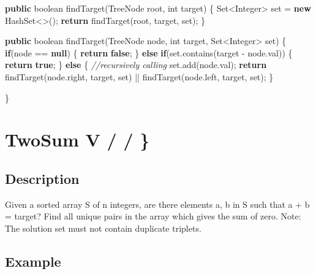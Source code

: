 \documentclass[]{book}
\newenvironment{Shaded}{\begin{snugshade}}{\end{snugshade}}
\newcommand{\BuiltInTok}[1]{#1}
\newcommand{\CommentTok}[1]{\textcolor[rgb]{0.56,0.35,0.01}{\textit{#1}}}
\newcommand{\DataTypeTok}[1]{\textcolor[rgb]{0.13,0.29,0.53}{#1}}
\newcommand{\FunctionTok}[1]{\textcolor[rgb]{0.00,0.00,0.00}{#1}}
\newcommand{\KeywordTok}[1]{\textcolor[rgb]{0.13,0.29,0.53}{\textbf{#1}}}
\newcommand{\NormalTok}[1]{#1}
\begin{document}
\begin{Shaded}
\begin{Highlighting}[]
\KeywordTok{public} \DataTypeTok{boolean} \FunctionTok{findTarget}\NormalTok{(}\BuiltInTok{TreeNode}\NormalTok{ root, }\DataTypeTok{int}\NormalTok{ target) \{}
    \BuiltInTok{Set}\NormalTok{<}\BuiltInTok{Integer}\NormalTok{> set = }\KeywordTok{new} \BuiltInTok{HashSet}\NormalTok{<>();}
    \KeywordTok{return} \FunctionTok{findTarget}\NormalTok{(root, target, set);}
\NormalTok{\}}

\KeywordTok{public} \DataTypeTok{boolean} \FunctionTok{findTarget}\NormalTok{(}\BuiltInTok{TreeNode}\NormalTok{ node, }\DataTypeTok{int}\NormalTok{ target, }\BuiltInTok{Set}\NormalTok{<}\BuiltInTok{Integer}\NormalTok{> set) \{}
    \KeywordTok{if}\NormalTok{(node == }\KeywordTok{null}\NormalTok{) \{}
        \KeywordTok{return} \KeywordTok{false}\NormalTok{;}
\NormalTok{    \} }\KeywordTok{else} \KeywordTok{if}\NormalTok{(set.}\FunctionTok{contains}\NormalTok{(target - node.}\FunctionTok{val}\NormalTok{)) \{}
        \KeywordTok{return} \KeywordTok{true}\NormalTok{;}
\NormalTok{    \} }\KeywordTok{else}\NormalTok{ \{}
        \CommentTok{//recursively calling}
\NormalTok{        set.}\FunctionTok{add}\NormalTok{(node.}\FunctionTok{val}\NormalTok{);}
        \KeywordTok{return} \FunctionTok{findTarget}\NormalTok{(node.}\FunctionTok{right}\NormalTok{, target, set) || }\FunctionTok{findTarget}\NormalTok{(node.}\FunctionTok{left}\NormalTok{, target, set);}
\NormalTok{    \}}

\NormalTok{\}}
\end{Highlighting}
\end{Shaded}

\hypertarget{twosum-v}{%
\section{TwoSum V / / \}}\label{twosum-v}}

\hypertarget{description-4}{%
\subsection{Description}\label{description-4}}

Given a sorted array S of n integers, are there elements a, b in S such that a + b = target? Find all unique
pairs in the array which gives the sum of zero. Note: The solution set must not contain duplicate triplets.

\hypertarget{example-3}{%
\subsection{Example}\label{example-3}}
\end{document}
